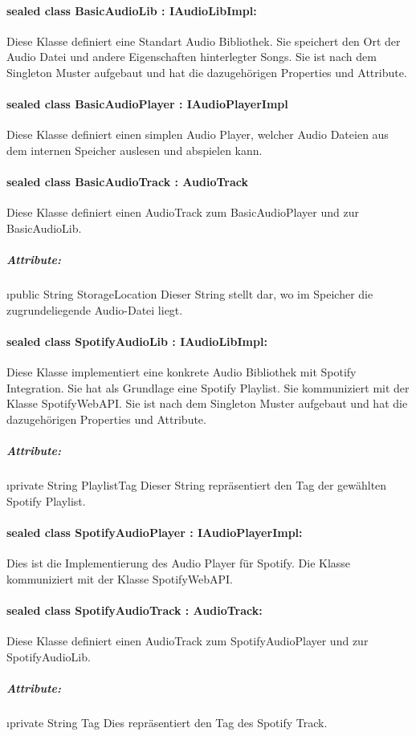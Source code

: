 \documentclass[../entwurf.tex]{subfiles}
\begin{document}
			\paragraph{sealed class BasicAudioLib : IAudioLibImpl:}
				Diese Klasse definiert eine Standart Audio Bibliothek. Sie speichert den Ort der Audio Datei und andere Eigenschaften hinterlegter 
				Songs. Sie ist nach dem Singleton Muster aufgebaut und hat die dazugehörigen Properties und Attribute.
			\paragraph{sealed class BasicAudioPlayer : IAudioPlayerImpl}
				Diese Klasse definiert einen simplen Audio Player, welcher Audio Dateien aus dem internen Speicher auslesen und abspielen kann.
			\paragraph{sealed class BasicAudioTrack : AudioTrack}
				Diese Klasse definiert einen AudioTrack zum BasicAudioPlayer und zur BasicAudioLib.
				\subparagraph{Attribute:}
					\begin{itemize}
						\i{public String StorageLocation} Dieser String stellt dar, wo im Speicher die zugrundeliegende Audio-Datei liegt.
					\end{itemize}
			\paragraph{sealed class SpotifyAudioLib : IAudioLibImpl:}
				Diese Klasse implementiert eine konkrete Audio Bibliothek mit Spotify Integration.
				Sie hat als Grundlage eine Spotify Playlist. Sie kommuniziert mit der Klasse SpotifyWebAPI.
				Sie ist nach dem Singleton Muster aufgebaut und hat die dazugehörigen Properties und Attribute.
				\subparagraph{Attribute:}
					\begin{itemize}
						\i{private String PlaylistTag} Dieser String repräsentiert den Tag der gewählten Spotify Playlist.
					\end{itemize}
			\paragraph{sealed class SpotifyAudioPlayer : IAudioPlayerImpl:}
				Dies ist die Implementierung des Audio Player für Spotify. Die Klasse kommuniziert mit der Klasse SpotifyWebAPI.
			\paragraph{sealed class SpotifyAudioTrack : AudioTrack:}
				Diese Klasse definiert einen AudioTrack zum SpotifyAudioPlayer und zur SpotifyAudioLib.
				\subparagraph{Attribute:}
					\begin{itemize}
						\i{private String Tag} Dies repräsentiert den Tag des Spotify Track.
					\end{itemize}
\end{document}
